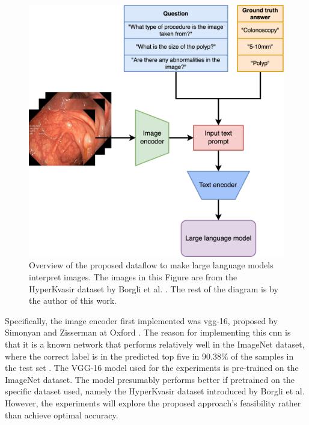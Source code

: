         \begin{figure}[htb]
            \centerline{
            \includegraphics[width=\textwidth]{images/alpaca_vision.png}}
            \caption[Overview of the proposed dataflow to make large language models interpret images.]{Overview of the proposed dataflow to make large language models interpret images. The images in this Figure are from the HyperKvasir dataset by Borgli et al. \cite{borgliHyperKvasirComprehensiveMulticlass2020}. The rest of the diagram is by the author of this work.}
            \label{fig:alpaca_vision}
        \end{figure}


        Specifically, the image encoder first implemented was \gls{vgg}-16, proposed by Simonyan and Zisserman at Oxford \cite{simonyanVeryDeepConvolutional2015}. The reason for implementing this \gls{cnn} is that it is a known network that performs relatively well in the ImageNet dataset, where the correct label is in the predicted top five in 90.38\% of the samples in the test set \cite{Vgg16TorchvisionMain}. The VGG-16 model used for the experiments is pre-trained on the ImageNet \cite{dengImageNetLargeScaleHierarchical2009} dataset. The model presumably performs better if pretrained on the specific dataset used, namely the HyperKvasir dataset \cite{borgliHyperKvasirComprehensiveMulticlass2020} introduced by Borgli et al. However, the experiments will explore the proposed approach's feasibility rather than achieve optimal accuracy.


